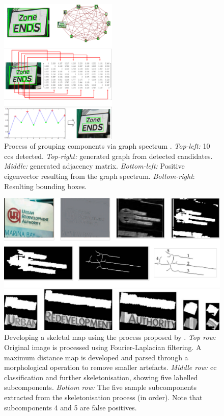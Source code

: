 \begin{figure}[p!]
  \centering
  \includegraphics[width=0.5\textwidth]{images/background/zhang2010_graphspectrum}
  \caption[Using graph spectrum to cluster CCs]{Process of grouping components via graph spectrum \citep{Zhang:2010wa}. \textit{Top-left:} 10 \glspl{cc} detected. \textit{Top-right:} generated graph from detected candidates. \textit{Middle:} generated adjacency matrix. \textit{Bottom-left:} Positive eigenvector resulting from the graph spectrum. \textit{Bottom-right}: Resulting bounding boxes.}
  \label{fig:background:detection:cc:zhang2010_graphspectrum}
\end{figure}

\begin{figure}[p!]
  \centering
  \includegraphics[width=\textwidth]{images/background/shivakumara2010_skeleton}
  \caption[Skeletonisation process of CCs]{Developing a skeletal map using the process proposed by \citet{Shivakumara:2011dn}. \textit{Top row:} Original image is processed using Fourier-Laplacian filtering. A maximum distance map is developed and parsed through a morphological operation to remove smaller artefacts. \textit{Middle row:} \gls{cc} classification and further skeletonisation, showing five labelled subcomponents. \textit{Bottom row:} The five sample subcomponents extracted from the skeletonisation process (in order). Note that subcomponents 4 and 5 are false positives.}
  \label{fig:background:detection:cc:shivakumara2010_skeleton}
\end{figure}

